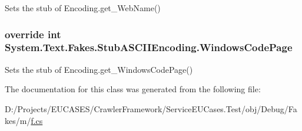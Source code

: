 Sets the stub of Encoding.\-get\-\_\-\-Web\-Name()

\hypertarget{class_system_1_1_text_1_1_fakes_1_1_stub_a_s_c_i_i_encoding_aab240d32c691877d3391c454f45933ef}{
\subsubsection[{Windows\-Code\-Page}]{\setlength{\rightskip}{0pt plus 5cm}override int System.\-Text.\-Fakes.\-Stub\-A\-S\-C\-I\-I\-Encoding.\-Windows\-Code\-Page\hspace{0.3cm}{\ttfamily [get]}}}\label{class_system_1_1_text_1_1_fakes_1_1_stub_a_s_c_i_i_encoding_aab240d32c691877d3391c454f45933ef}


Sets the stub of Encoding.\-get\-\_\-\-Windows\-Code\-Page()



The documentation for this class was generated from the following file\-:\begin{DoxyCompactItemize}
\item 
D\-:/\-Projects/\-E\-U\-C\-A\-S\-E\-S/\-Crawler\-Framework/\-Service\-E\-U\-Cases.\-Test/obj/\-Debug/\-Fakes/m/\hyperlink{m_2f_8cs}{f.\-cs}\end{DoxyCompactItemize}
